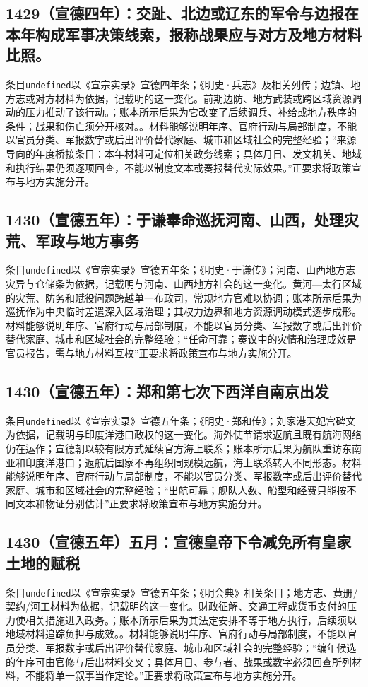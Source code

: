 \subsection{1429（宣德四年）：交趾、北边或辽东的军令与边报在本年构成军事决策线索，报称战果应与对方及地方材料比照。}
条目\texttt{undefined}以《宣宗实录》宣德四年条；《明史·兵志》及相关列传；边镇、地方志或对方材料为依据，记载明的这一变化。前期边防、地方武装或跨区域资源调动的压力推动了该行动。；账本所示后果为它改变了后续调兵、补给或地方秩序的条件；战果和伤亡须分开核对。。材料能够说明年序、官府行动与局部制度，不能以官员分类、军报数字或后出评价替代家庭、城市和区域社会的完整经验；“来源导向的年度桥接条目：本年材料可定位相关政务线索；具体月日、发文机关、地域和执行结果仍须逐项回查，不能以制度文本或奏报替代实际效果。”正要求将政策宣布与地方实施分开。

\subsection{1430（宣德五年）：于谦奉命巡抚河南、山西，处理灾荒、军政与地方事务}
条目\texttt{undefined}以《宣宗实录》宣德五年条；《明史·于谦传》；河南、山西地方志灾异与仓储条为依据，记载明与河南、山西地方社会的这一变化。黄河—太行区域的灾荒、防务和赋役问题跨越单一布政司，常规地方官难以协调；账本所示后果为巡抚作为中央临时差遣深入区域治理；其权力边界和地方资源调动模式逐步成形。材料能够说明年序、官府行动与局部制度，不能以官员分类、军报数字或后出评价替代家庭、城市和区域社会的完整经验；“任命可靠；奏议中的灾情和治理成效是官员报告，需与地方材料互校”正要求将政策宣布与地方实施分开。

\subsection{1430（宣德五年）：郑和第七次下西洋自南京出发}
条目\texttt{undefined}以《宣宗实录》宣德五年条；《明史·郑和传》；刘家港天妃宫碑文为依据，记载明与印度洋港口政权的这一变化。海外使节请求返航且既有航海网络仍在运作；宣德朝以较有限方式延续官方海上联系；账本所示后果为航队重访东南亚和印度洋港口；返航后国家不再组织同规模远航，海上联系转入不同形态。材料能够说明年序、官府行动与局部制度，不能以官员分类、军报数字或后出评价替代家庭、城市和区域社会的完整经验；“出航可靠；舰队人数、船型和经费只能按不同文本和物证分别估计”正要求将政策宣布与地方实施分开。

\subsection{1430（宣德五年）五月：宣德皇帝下令减免所有皇家土地的赋税}
条目\texttt{undefined}以《宣宗实录》宣德五年条；《明会典》相关条目；地方志、黄册/契约/河工材料为依据，记载明的这一变化。财政征解、交通工程或货币支付的压力使相关措施进入政务。；账本所示后果为其法定安排不等于地方执行，后续须以地域材料追踪负担与成效。。材料能够说明年序、官府行动与局部制度，不能以官员分类、军报数字或后出评价替代家庭、城市和区域社会的完整经验；“编年候选的年序可由官修与后出材料交叉；具体月日、参与者、战果或数字必须回查所列材料，不能将单一叙事当作定论。”正要求将政策宣布与地方实施分开。

